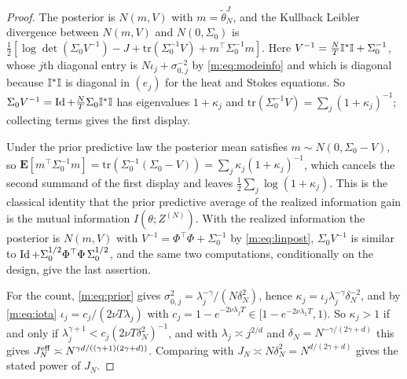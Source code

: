 \begin{proof}
The posterior is $N(m,V)$ with $m=\tilde\theta^J_N$, and the Kullback Leibler divergence between $N(m,V)$ and $N(0,\Sigma_0)$ is $\tfrac12[\log\det(\Sigma_0V^{-1})-J+\mathrm{tr}(\Sigma_0^{-1}V)+m^\top\Sigma_0^{-1}m]$. Here $V^{-1}=\tfrac NT\mathbb{I}^*\mathbb{I}+\Sigma_0^{-1}$, whose $j$th diagonal entry is $N\iota_j+\sigma_{0,j}^{-2}$ by \eqref{m:eq:modeinfo} and which is diagonal because $\mathbb{I}^*\mathbb{I}$ is diagonal in $(e_j)$ for the heat and Stokes equations. So $\Sigma_0V^{-1}=\operatorname{Id}+\tfrac NT\Sigma_0\mathbb{I}^*\mathbb{I}$ has eigenvalues $1+\kappa_j$ and $\mathrm{tr}(\Sigma_0^{-1}V)=\sum_j(1+\kappa_j)^{-1}$; collecting terms gives the first display.

Under the prior predictive law the posterior mean satisfies $m\sim N(0,\Sigma_0-V)$, so $\mathbf{E}[m^\top\Sigma_0^{-1}m]=\mathrm{tr}(\Sigma_0^{-1}(\Sigma_0-V))=\sum_j\kappa_j(1+\kappa_j)^{-1}$, which cancels the second summand of the first display and leaves $\tfrac12\sum_j\log(1+\kappa_j)$. This is the classical identity that the prior predictive average of the realized information gain is the mutual information $I(\theta;Z^{(N)})$. With the realized information the posterior is $N(m,V)$ with $V^{-1}=\Phi^\top\Phi+\Sigma_0^{-1}$ by \eqref{m:eq:linpost}, $\Sigma_0V^{-1}$ is similar to $\operatorname{Id}+\Sigma_0^{1/2}\Phi^\top\Phi\,\Sigma_0^{1/2}$, and the same two computations, conditionally on the design, give the last assertion.

For the count, \eqref{m:eq:prior} gives $\sigma^2_{0,j}=\lambda_j^{-\gamma}/(N\delta_N^2)$, hence $\kappa_j=\iota_j\lambda_j^{-\gamma}\delta_N^{-2}$, and by \eqref{m:eq:iota} $\iota_j=c_j/(2\nu T\lambda_j)$ with $c_j=1-e^{-2\nu\lambda_jT}\in[1-e^{-2\nu\lambda_1T},1)$. So $\kappa_j>1$ if and only if $\lambda_j^{\gamma+1}<c_j(2\nu T\delta_N^2)^{-1}$, and with $\lambda_j\asymp j^{2/d}$ and $\delta_N=N^{-\gamma/(2\gamma+d)}$ this gives $J^{\rm eff}_N\asymp N^{\gamma d/((\gamma+1)(2\gamma+d))}$. Comparing with $J_N\asymp N\delta_N^2=N^{d/(2\gamma+d)}$ gives the stated power of $J_N$.
\end{proof}

